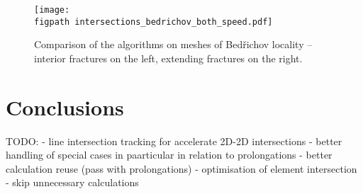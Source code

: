 \documentclass{elsarticle}
\newcommand{\figpath}{figures/}
\begin{document}
\begin{figure}[!htb]
    \centering
    \texttt{[image: \\figpath intersections\_bedrichov\_both\_speed.pdf]}
    \caption{Comparison of the algorithms on meshes of Bed{\v r}ichov locality -- interior fractures on the left,
             extending fractures on the right.}
    \label{fig:bedrichov_speed}
\end{figure}





\section{Conclusions}
\label{sec:conclusins}

TODO:
- line intersection tracking for accelerate 2D-2D intersections
- better handling of special cases in paarticular in relation to prolongations
- better calculation reuse (pass with prolongations)
- optimisation of element intersection - skip unnecessary calculations






% 
% 
% 
  
 
\end{document}
